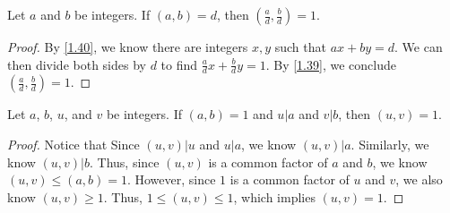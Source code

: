 \documentclass[../main.tex]{subfiles}
\begin{document}
\begin{thm} \label{2.30}
  Let $a$ and $b$ be integers. If $(a,b) = d$, then $(\frac a d , \frac b d) = 1$.
\end{thm}

\begin{proof}
  By \ref{1.40}, we know there are integers $x, y$ such that $ax + by = d$. We can then divide both sides by $d$ to find $\frac a d x + \frac b d y = 1$. By \ref{1.39}, we conclude $(\frac a d , \frac b d) = 1$.
\end{proof}



\begin{thm} \label{2.31}
  Let $a$, $b$, $u$, and $v$ be integers. If $(a,b) = 1$ and $u|a$ and $v|b$, then $(u,v) = 1$.
\end{thm}

\begin{proof}
  Notice that Since $(u,v) | u$ and $u | a$, we know $(u,v) | a$. Similarly, we know $(u,v) | b$. Thus, since $(u, v)$ is a common factor of $a$ and $b$, we know $(u,v) \leq (a, b) = 1$. However, since $1$ is a common factor of $u$ and $v$, we also know $(u, v) \geq 1$. Thus, $1 \leq (u, v) \leq 1$, which implies $(u, v) = 1$.
\end{proof}



\pagebreak
\end{document}
